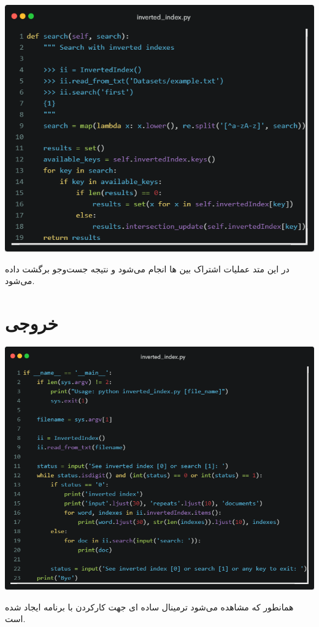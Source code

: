 \documentclass[12pt, dvipsnames, svgnames, x11names,]{article}
\begin{document}
		\includegraphics[width=14cm]{images/4.png} \par
		{\normalsize 
			در این متد عملیات اشتراک بین ها انجام می‌شود و نتیجه جست‌و‌جو برگشت داده می‌شود.
		}
		
	
	
	\section{خروجی}
	
		\includegraphics[width=14cm]{images/5.png} \par
		{\normalsize 
			همانطور که مشاهده می‌شود ترمینال ساده ای جهت کارکردن با برنامه ایجاد شده است.
		}		
	
	
\end{document}
